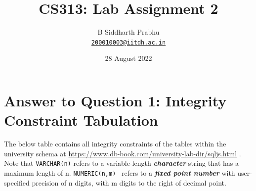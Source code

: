 \documentclass{article}
\title{CS313: Lab Assignment 2}
\author{
  B Siddharth Prabhu\\
  \href{mailto:200010003@iitdh.ac.in}{\texttt{200010003@iitdh.ac.in}}
  }
\date{28 August 2022}
\let\oldtexttt\texttt
\renewcommand{\texttt}[1]{
  \colorbox{bgcolor}{\oldtexttt{#1}}
  }
\begin{document}
\maketitle

\section{Answer to Question 1: Integrity Constraint Tabulation}
The below table contains all integrity constraints of the tables within the university schema at {\color{blue}\href{https://www.db-book.com/university-lab-dir/sqljs.html}{https://www.db-book.com/university-lab-dir/sqljs.html}} . Note that\texttt{VARCHAR(n)}refers to a variable-length {\color{red}\textit{\textbf{character}}} string that has a maximum length of n.\texttt{NUMERIC(n,m)}~refers to a {\color{red}\textit{\textbf{fixed point number}}} with user-specified precision of n digits, with m digits to the right of decimal point. 
\end{document}

